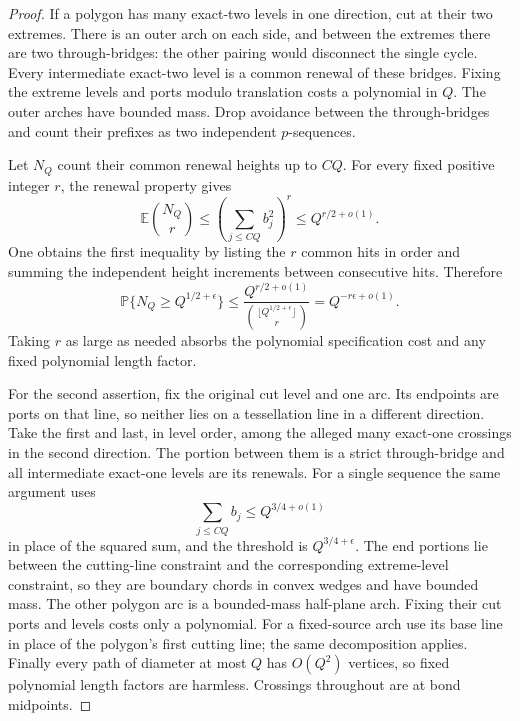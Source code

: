 \begin{proof}
If a polygon has many exact-two levels in one direction, cut at their two
extremes. There is an outer arch on each side, and between the extremes
there are two through-bridges: the other pairing would disconnect the
single cycle. Every intermediate exact-two level is a common renewal of
these bridges. Fixing the extreme levels and ports modulo translation
costs a polynomial in $Q$. The outer arches have bounded mass. Drop
avoidance between the through-bridges and count their prefixes as two
independent $p$-sequences.

Let $N_Q$ count their common renewal heights up to $CQ$. For every fixed
positive integer $r$, the renewal property gives
\[
 \mathbb E\binom{N_Q}{r}
 \le\left(\sum_{j\le CQ}b_j^2\right)^r
 \le Q^{r/2+o(1)}.
\]
One obtains the first inequality by listing the $r$ common hits in order
and summing the independent height increments between consecutive hits.
Therefore
\[
 \mathbb P\{N_Q\ge Q^{1/2+\epsilon}\}
 \le
 \frac{Q^{r/2+o(1)}}{\binom{\lfloor Q^{1/2+\epsilon}\rfloor}{r}}
 =Q^{-r\epsilon+o(1)}.
\]
Taking $r$ as large as needed absorbs the polynomial specification cost
and any fixed polynomial length factor.

For the second assertion, fix the original cut level and one arc. Its
endpoints are ports on that line, so neither lies on a tessellation line
in a different direction. Take the first and last, in level order, among
the alleged many exact-one crossings in the second direction. The portion
between them is a strict through-bridge and all intermediate exact-one
levels are its renewals. For a single sequence the same argument uses
\[
 \sum_{j\le CQ}b_j\le Q^{3/4+o(1)}
\]
in place of the squared sum, and the threshold is $Q^{3/4+\epsilon}$.
The end portions lie between the cutting-line constraint and the
corresponding extreme-level constraint, so they are boundary chords in
convex wedges and have bounded mass. The other polygon arc is a
bounded-mass half-plane arch. Fixing their cut ports and levels costs
only a polynomial. For a fixed-source arch use its base line in place
of the polygon's first cutting line; the same decomposition applies.
Finally every path of diameter at most $Q$ has $O(Q^2)$ vertices, so fixed
polynomial length factors are harmless. Crossings throughout are at bond
midpoints.
\end{proof}

